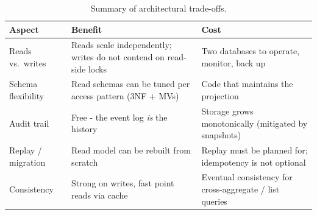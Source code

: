 \documentclass[11pt,a4paper]{article}
\begin{document}
\begin{table}[H]
\centering
\caption{Summary of architectural trade-offs.}
\begin{tabularx}{\textwidth}{l>{\raggedright\arraybackslash}X>{\raggedright\arraybackslash}X}
\toprule
\textbf{Aspect}        & \textbf{Benefit}                                                              & \textbf{Cost}                                              \\
\midrule
Reads vs.\ writes      & Reads scale independently; writes do not contend on read-side locks          & Two databases to operate, monitor, back up                 \\
Schema flexibility     & Read schemas can be tuned per access pattern (3NF + MVs)                     & Code that maintains the projection                         \\
Audit trail            & Free - the event log \emph{is} the history                                  & Storage grows monotonically (mitigated by snapshots)       \\
Replay / migration     & Read model can be rebuilt from scratch                                       & Replay must be planned for; idempotency is not optional    \\
Consistency            & Strong on writes, fast point reads via cache                                  & Eventual consistency for cross-aggregate / list queries    \\
\bottomrule
\end{tabularx}
\end{table}



\end{document}
